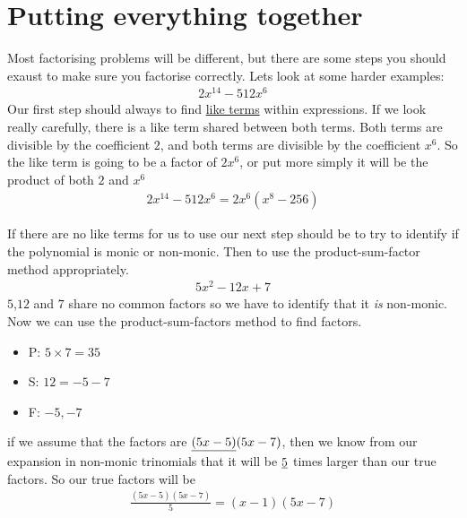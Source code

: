 \documentclass{article}
\begin{document}
\section{Putting everything together}
Most factorising problems will be different, but there are some steps you should exaust to make sure you factorise correctly. Lets look at some harder examples:
\begin{align*}
    2x^{14}-512x^6
\end{align*}
Our first step should always to find \uline{like terms} within expressions. If we look really carefully, there is a like term shared between both terms. Both terms are divisible by the coefficient $2$, and both terms are divisible by the coefficient $x^6$. So the like term is going to be a factor of $2x^6$, or put more simply it will be the product of both $2$ and $x^6$
\begin{align*}
    2x^{14}-512x^6 = 2x^6(x^8-256)
\end{align*}

If there are no like terms for us to use our next step should be to try to identify if the polynomial is monic or non-monic. Then to use the product-sum-factor method appropriately.
\begin{align*}
    5x^2 - 12x + 7
\end{align*}
$5$,$12$ and $7$ share no common factors so we have to identify that it \emph{is} non-monic. Now we can use the product-sum-factors method to find factors. 
\begin{itemize}
    \item P: $ 5\times 7  = 35$
    \item S: $ 12 = -5-7$
    \item F: $-5,-7$
\end{itemize}
if we assume that the factors are $\uline{(5x-5)}(5x-7)$, then we know from our expansion in non-monic trinomials that it will be $\uline{5}$ times larger than our true factors. So our true factors will be 
\begin{align*}
    \frac{(5x-5)(5x-7)}{5} = (x-1)(5x-7)
\end{align*}
\printglossaries
\end{document}
